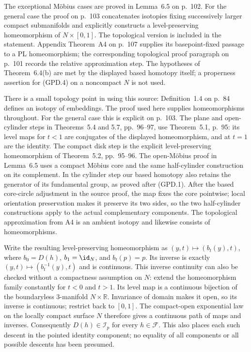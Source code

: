 The exceptional M\"obius cases are proved in Lemma~6.5 on p.~102.
For the general case the proof on p.~103 concatenates isotopies
fixing successively larger compact submanifolds and explicitly
constructs a level-preserving homeomorphism of $N\times[0,1]$.
The topological version is included in the statement. Appendix
Theorem~A4 on p.~107 supplies its basepoint-fixed passage to a
PL homeomorphism; the corresponding topological proof paragraph
on p.~101 records the relative approximation step.
The hypotheses of Theorem~6.4(b) are met by the displayed
based homotopy itself; a properness assertion for (GPD.4)
on a noncompact $N$ is not used.

There is a small topology point in using this source:
Definition~1.4 on p.~84 defines an isotopy of embeddings.
The proof used here supplies homeomorphisms throughout.
For the general case this is explicit on p.~103.
The plane and open-cylinder steps in Theorems~5.4 and 5.7,
pp.~96--97, use Theorem~5.1, p.~95: its level maps for
$t<1$ are conjugates of the displayed homeomorphism, and
at $t=1$ are the identity. The compact disk step is the
explicit level-preserving homeomorphism of Theorem~5.2,
pp.~95--96. The open-M\"obius proof in Lemma~6.5 uses a
compact M\"obius core and the same half-cylinder construction
on its complement. In the cylinder step our based homotopy
also retains the generator of its fundamental group, as
proved after (GPD.1). After the based core-circle adjustment
in the source proof, the map fixes the core pointwise;
local orientation preservation makes it preserve its two
sides, so the two half-cylinder constructions apply to
the actual complementary components.
The topological approximation from A4 is an ambient
isotopy and likewise consists of homeomorphisms.

Write the resulting level-preserving homeomorphism as
$(y,t)\mapsto(b_t(y),t)$, where $b_0=D(h)$, $b_1=\id_N$,
and $b_t(p)=p$. Its inverse is exactly
$(y,t)\mapsto(b_t^{-1}(y),t)$ and is continuous.
This inverse continuity can also be checked without a
compactness assumption on $N$: extend the homeomorphism
family constantly for $t<0$ and $t>1$. Its level map is
a continuous bijection of the boundaryless $3$-manifold
$N\times\mathbb R$. Invariance of domain makes it open,
so its inverse is continuous; restrict back to $[0,1]$.
The compact-open exponential law on the locally compact
surface $N$ therefore gives a continuous path of maps and
inverses. Consequently $D(h)\in\mathscr I_p$ for every
$h\in\mathscr F$. This also places each such descent in the
pointed identity component; no equality of all components
or all possible descents has been presumed.

